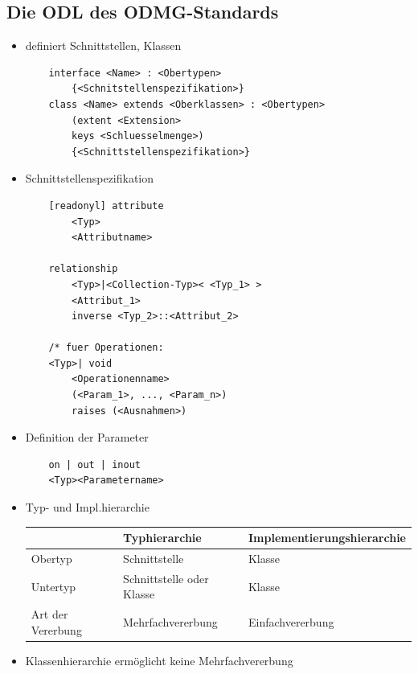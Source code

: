 \subsection{Die ODL des ODMG-Standards}
\begin{itemize}
	\item definiert Schnittstellen, Klassen 
	\begin{lstlisting}
	interface <Name> : <Obertypen>
		{<Schnitstellenspezifikation>}
	class <Name> extends <Oberklassen> : <Obertypen>
		(extent <Extension>
		keys <Schluesselmenge>)
		{<Schnittstellenspezifikation>}
	\end{lstlisting}
	
	\item Schnittstellenspezifikation
	\begin{lstlisting}
	[readonyl] attribute
		<Typ>
		<Attributname>
		
	relationship
		<Typ>|<Collection-Typ>< <Typ_1> >
		<Attribut_1>
		inverse <Typ_2>::<Attribut_2>
		
	/* fuer Operationen:
	<Typ>| void
		<Operationenname>
		(<Param_1>, ..., <Param_n>)
		raises (<Ausnahmen>)
	\end{lstlisting}
	
	\item Definition der Parameter
	\begin{lstlisting}
	on | out | inout
	<Typ><Parametername>
	\end{lstlisting}
	
	\item Typ- und Impl.hierarchie
	\begin{table}[!h]
		\centering
		\begin{tabular}{|p{10em}||p{15em}|p{15em}|}
			\hline
			&	Typhierarchie	& Implementierungshierarchie\\
			\hline
			\hline
			Obertyp	& Schnittstelle	& Klasse\\
			\hline
			Untertyp	& Schnittstelle oder Klasse	& Klasse\\
			\hline
			Art der Vererbung	& Mehrfachvererbung	& Einfachvererbung\\
			\hline
		\end{tabular}
	\end{table}
	\item Klassenhierarchie ermöglicht keine Mehrfachvererbung
\end{itemize}


